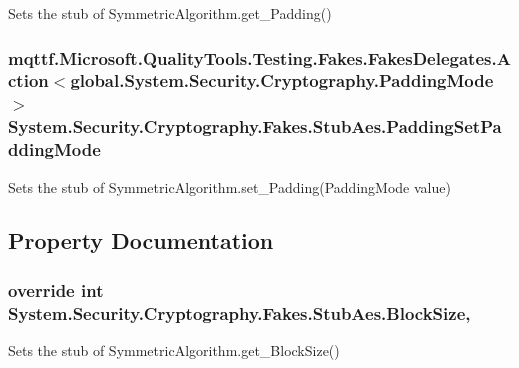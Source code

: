 Sets the stub of Symmetric\-Algorithm.\-get\-\_\-\-Padding()

\hypertarget{class_system_1_1_security_1_1_cryptography_1_1_fakes_1_1_stub_aes_ad606fffc2f8745d5c2cc7cbeb187d920}{
\subsubsection[{Padding\-Set\-Padding\-Mode}]{\setlength{\rightskip}{0pt plus 5cm}mqttf.\-Microsoft.\-Quality\-Tools.\-Testing.\-Fakes.\-Fakes\-Delegates.\-Action$<$global.\-System.\-Security.\-Cryptography.\-Padding\-Mode$>$ System.\-Security.\-Cryptography.\-Fakes.\-Stub\-Aes.\-Padding\-Set\-Padding\-Mode}}\label{class_system_1_1_security_1_1_cryptography_1_1_fakes_1_1_stub_aes_ad606fffc2f8745d5c2cc7cbeb187d920}


Sets the stub of Symmetric\-Algorithm.\-set\-\_\-\-Padding(\-Padding\-Mode value)



\subsection{Property Documentation}
\hypertarget{class_system_1_1_security_1_1_cryptography_1_1_fakes_1_1_stub_aes_a8c105f52d785f5385152d87ad6f73101}{
\subsubsection[{Block\-Size}]{\setlength{\rightskip}{0pt plus 5cm}override int System.\-Security.\-Cryptography.\-Fakes.\-Stub\-Aes.\-Block\-Size\hspace{0.3cm}{\ttfamily [get]}, {\ttfamily [set]}}}\label{class_system_1_1_security_1_1_cryptography_1_1_fakes_1_1_stub_aes_a8c105f52d785f5385152d87ad6f73101}


Sets the stub of Symmetric\-Algorithm.\-get\-\_\-\-Block\-Size()


